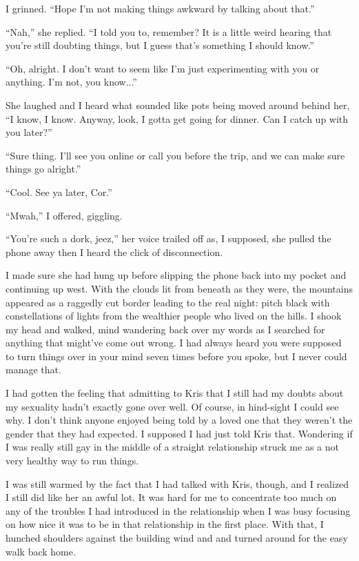 I grinned.  ``Hope I'm not making things awkward by talking about that.''

``Nah,'' she replied.  ``I told you to, remember?  It is a little weird hearing that you're still doubting things, but I guess that's something I should know.''

``Oh, alright.  I don't want to seem like I'm just experimenting with you or anything.  I'm not, you know...''

She laughed and I heard what sounded like pots being moved around behind her, ``I know, I know.  Anyway, look, I gotta get going for dinner.  Can I catch up with you later?''

``Sure thing.  I'll see you online or call you before the trip, and we can make sure things go alright.''

``Cool.  See ya later, Cor.''

``Mwah,'' I offered, giggling.

``You're such a dork, jeez,'' her voice trailed off as, I supposed, she pulled the phone away then I heard the click of disconnection.

I made sure she had hung up before slipping the phone back into my pocket and continuing up west.  With the clouds lit from beneath as they were, the mountains appeared as a raggedly cut border leading to the real night: pitch black with constellations of lights from the wealthier people who lived on the hills.  I shook my head and walked, mind wandering back over my words as I searched for anything that might've come out wrong.  I had always heard you were supposed to turn things over in your mind seven times before you spoke, but I never could manage that.

I had gotten the feeling that admitting to Kris that I still had my doubts about my sexuality hadn't exactly gone over well.  Of course, in hind-sight I could see why.  I don't think anyone enjoyed being told by a loved one that they weren't the gender that they had expected.  I supposed I had just told Kris that.  Wondering if I was really still gay in the middle of a straight relationship struck me as a not very healthy way to run things.

I was still warmed by the fact that I had talked with Kris, though, and I realized I still did like her an awful lot.  It was hard for me to concentrate too much on any of the troubles I had introduced in the relationship when I was busy focusing on how nice it was to be in that relationship in the first place.  With that, I hunched shoulders against the building wind and and turned around for the easy walk back home.
